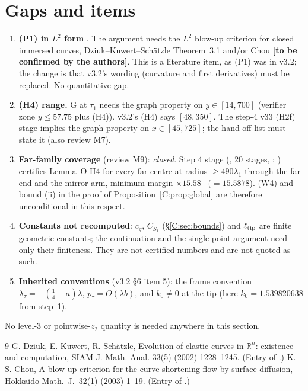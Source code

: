 \documentclass[11pt]{article}
\begin{document}
\section{Gaps and items}\label{C:sec:gaps}
\begin{enumerate}[leftmargin=*]
\item \textbf{(P1) in $L^2$ form} \tH. The argument needs the $L^2$ blow-up criterion for closed immersed curves, Dziuk--Kuwert--Sch\"atzle \cite{DKS2002} Theorem~3.1 and/or Chou \cite{Chou2003} \textbf{[to be confirmed by the authors]}. This is a literature item, as (P1) was in v3.2; the change is that v3.2's wording (curvature and first derivatives) must be replaced. No quantitative gap.
\item \textbf{(H4) range.} G at $\tau_1$ needs the graph property on $y\in[14,700]$ (verifier zone $y\le57.75$ plus (H4)). v3.2's (H4) says $[48,350]$. The step-4 v33 (H2f) stage implies the graph property on $x\in[45,725]$; the hand-off list must state it (also review M7).
\item \textbf{Far-family coverage} (review M9): \emph{closed}. Step 4 stage  (, 20 stages, ; ) certifies Lemma~O H4 for every far centre at radius $\ge490\lambda_1$ through the far end and the mirror arm, minimum margin $\times15.58$ \tC\ ($=15.5878$). (W4) and bound (ii) in the proof of Proposition~\ref{C:prop:global} are therefore unconditional in this respect.
\item \textbf{Constants not recomputed}: $c_g$, $C_{S_1}$ (\S\ref{C:sec:bounds}) and $\ell_{\rm tip}$ are finite geometric constants; the continuation and the single-point argument need only their finiteness. They are not certified numbers and are not quoted as such.
\item \textbf{Inherited conventions} (v3.2 \S6 item 5): the frame convention $\lambda_\tau=-(\frac14-a)\lambda$, $p_\tau=O(\lambda b)$, and $k_0\ne0$ at the tip (here $k_0=1.539820638$ from step~1).
\end{enumerate}
No level-3 or pointwise-$z_2$ quantity is needed anywhere in this section.

\ifdefined\stepmain\else
\begin{thebibliography}{9}
 G. Dziuk, E. Kuwert, R. Sch\"atzle, Evolution of elastic curves in $\mathbb R^n$: existence and computation, SIAM J. Math. Anal. 33(5) (2002) 1228--1245. (Entry  of .)
 K.-S. Chou, A blow-up criterion for the curve shortening flow by surface diffusion, Hokkaido Math.\ J.\ 32(1) (2003) 1--19. (Entry  of .)
\end{thebibliography}
\end{document}

